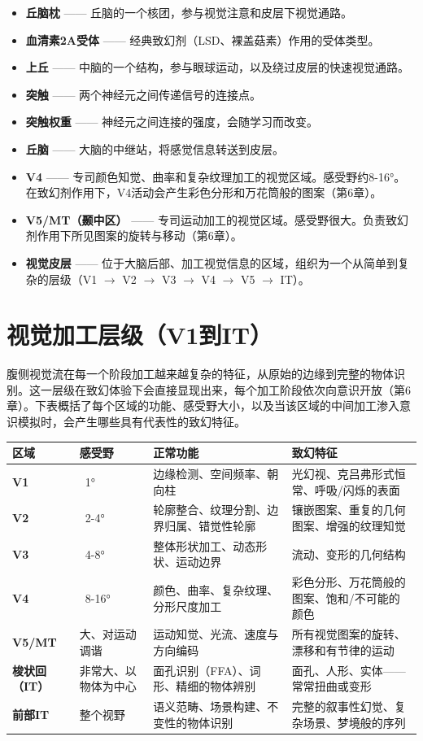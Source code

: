 \documentclass[11pt, twoside, openright]{book}
\begin{document}
\begin{itemize}
  \item \textbf{丘脑枕} ------ 丘脑的一个核团，参与视觉注意和皮层下视觉通路。
  \item \textbf{血清素2A受体} ------ 经典致幻剂（LSD、裸盖菇素）作用的受体类型。
  \item \textbf{上丘} ------ 中脑的一个结构，参与眼球运动，以及绕过皮层的快速视觉通路。
  \item \textbf{突触} ------ 两个神经元之间传递信号的连接点。
  \item \textbf{突触权重} ------ 神经元之间连接的强度，会随学习而改变。
  \item \textbf{丘脑} ------ 大脑的中继站，将感觉信息转送到皮层。
  \item \textbf{V4} ------ 专司颜色知觉、曲率和复杂纹理加工的视觉区域。感受野约8-16°。在致幻剂作用下，V4活动会产生彩色分形和万花筒般的图案（第6章）。
  \item \textbf{V5/MT（颞中区）} ------ 专司运动加工的视觉区域。感受野很大。负责致幻剂作用下所见图案的旋转与移动（第6章）。
  \item \textbf{视觉皮层} ------ 位于大脑后部、加工视觉信息的区域，组织为一个从简单到复杂的层级（V1 $\rightarrow$ V2 $\rightarrow$ V3 $\rightarrow$ V4 $\rightarrow$ V5 $\rightarrow$ IT）。
\end{itemize}

\section*{视觉加工层级（V1到IT）}

腹侧视觉流在每一个阶段加工越来越复杂的特征，从原始的边缘到完整的物体识别。这一层级在致幻体验下会直接显现出来，每个加工阶段依次向意识开放（第6章）。下表概括了每个区域的功能、感受野大小，以及当该区域的中间加工渗入意识模拟时，会产生哪些具有代表性的致幻特征。


{\small
\noindent
\begin{tabularx}{\linewidth}{X X X X}
\toprule
\textbf{区域} & \textbf{感受野} & \textbf{正常功能} & \textbf{致幻特征} \\
\midrule
\textbf{V1} & ~1° & 边缘检测、空间频率、朝向柱 & 光幻视、克吕弗形式恒常、呼吸/闪烁的表面 \\[4pt]
\textbf{V2} & ~2-4° & 轮廓整合、纹理分割、边界归属、错觉性轮廓 & 镶嵌图案、重复的几何图案、增强的纹理知觉 \\[4pt]
\textbf{V3} & ~4-8° & 整体形状加工、动态形状、运动边界 & 流动、变形的几何结构 \\[4pt]
\textbf{V4} & ~8-16° & 颜色、曲率、复杂纹理、分形尺度加工 & 彩色分形、万花筒般的图案、饱和/不可能的颜色 \\[4pt]
\textbf{V5/MT} & 大、对运动调谐 & 运动知觉、光流、速度与方向编码 & 所有视觉图案的旋转、漂移和有节律的运动 \\[4pt]
\textbf{梭状回（IT）} & 非常大、以物体为中心 & 面孔识别（FFA）、词形、精细的物体辨别 & 面孔、人形、实体------常常扭曲或变形 \\[4pt]
\textbf{前部IT} & 整个视野 & 语义范畴、场景构建、不变性的物体识别 & 完整的叙事性幻觉、复杂场景、梦境般的序列 \\[4pt]
\bottomrule
\end{tabularx}
}
\end{document}
